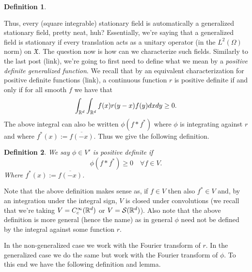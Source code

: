 \documentclass[12pt]{article}
\newtheorem{definition}{Definition}
\begin{document}
\begin{CJK*}{UTF8}{gbsn}
\begin{definition}
	\end{definition}
	Thus, every (square integrable) stationary field is automatically a generalized stationary field, pretty neat, huh? Essentially, we're saying that a generalized field is stationary if every translation acts as a unitary operator (in the $L^2(\Omega)$ norm) on $\mathfrak{X}$. The question now is how can we characterize such fields. Similarly to the last post (link), we're going to first need to define what we mean by a \emph{positive definite generalized function}. We recall that by an equivalent characterization for positive definite functions (link), a continuous function $r$ is positive definite if and only if for all smooth $f$ we have that
	\begin{equation*}
		\int_{{\mathbb R}^d}\int_{{\mathbb R}^d}f(x)r(y-x)f(y) dx dy\geq 0.
	\end{equation*}
	The above integral can also be written $\phi(f*f^*)$ where $\phi$ is integrating against $r$ and where $f^*(x):=\overline{f(-x)}$. Thus we give the following definition.
	\begin{definition}
		We say $\phi\in V'$ is positive definite if
		\begin{equation*}
			\phi(f*{f}^*)\geq 0\quad\forall f\in V.
		\end{equation*}
		Where $f^*(x):=\overline{f(-x)}$.
	\end{definition}
	Note that the above definition makes sense as, if $f\in V$ then also $f^*\in V$ and, by an integration under the integral sign, $V$ is closed under convolutions (we recall that we're taking $V=C_c^\infty({\mathbb R}^d)$ or $V={\mathcal S}({\mathbb R}^d)$). Also note that the above definition is more general (hence the name) as in general $\phi$ need not be defined by the integral against some function $r$.

	In the non-generalized case we work with the Fourier transform of $r$. In the generalized case we do the same but work with the Fourier transform of  $\phi$. To this end we have the following definition and lemma.


\end{CJK*}
\end{document}
